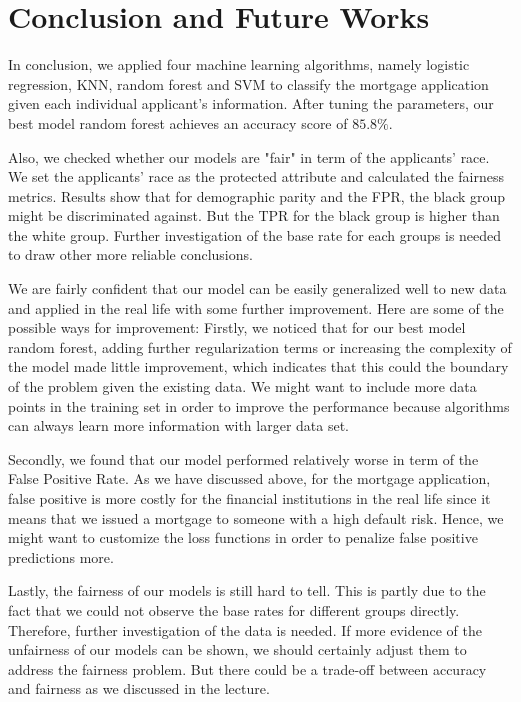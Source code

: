 \documentclass[letterpaper, 10 pt, conference]{ieeeconf}  %
\begin{document}
\section{Conclusion and Future Works}
In conclusion, we applied four machine learning algorithms, namely logistic regression, KNN, random forest and SVM to classify the mortgage application given each individual applicant's information. After tuning the parameters, our best model random forest achieves an accuracy score of $85.8\%$. 

Also, we checked whether our models are "fair" in term of the applicants' race. We set the applicants' race as the protected attribute and calculated the fairness metrics. Results show that for demographic parity and the FPR, the black group might be discriminated against. But the TPR for the black group is higher than the white group. Further investigation of the base rate for each groups is needed to draw other more reliable conclusions. 


We are fairly confident that our model can be easily generalized well to new data and applied in the real life with some further improvement. Here are some of the possible ways for improvement:
Firstly, we noticed that for our best model random forest, adding further regularization terms or increasing the complexity of the model made little improvement, which indicates that this could the boundary of the problem given the existing data. We might want to include more data points in the training set in order to improve the performance because algorithms can always learn more information with larger data set.

Secondly, we found that our model performed relatively worse in term of the False Positive Rate. As we have discussed above, for the mortgage application, false positive is more costly for the financial institutions in the real life since it means that we issued a mortgage to someone with a high default risk. Hence, we might want to customize the loss functions in order to penalize false positive predictions more.

Lastly, the fairness of our models is still hard to tell. This is partly due to the fact that we could not observe the base rates for different groups directly. Therefore, further investigation of the data is needed. If more evidence of the unfairness of our models can be shown, we should certainly adjust them to address the fairness problem. But there could be a trade-off between accuracy and fairness as we discussed in the lecture.
\end{document}
